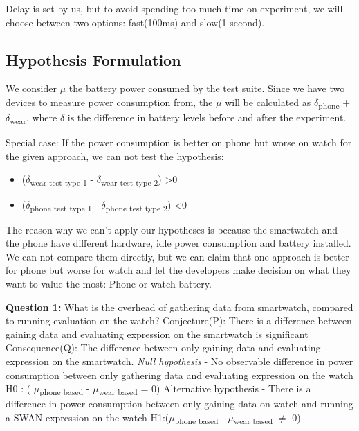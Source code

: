 Delay is set by us, but to avoid spending too much time on experiment, we will choose between two options: fast(100ms) and slow(1 second).

\subsection{ Hypothesis Formulation}

    We consider $\mu$ the battery power consumed by the test suite. Since we have two devices to measure power consumption from,
    the $\mu$ will be calculated as $\delta$\textsubscript{phone} +  $\delta$\textsubscript{wear}, where $\delta$ is the difference in battery levels 
    before and after the experiment.
    
    Special case:\label{special_case} If the power consumption is better on phone but worse on watch for the given approach, we can not test the hypothesis:
    \begin{itemize}
     \item ($\delta$\textsubscript{wear test type 1} -  $\delta$\textsubscript{wear test type 2}) \textgreater  0
     \item  ($\delta$\textsubscript{phone test type 1} -  $\delta$\textsubscript{phone test type 2}) \textless  0 
    \end{itemize}
    
    The reason why we can't apply our hypotheses is because the smartwatch and the phone have different hardware, idle power consumption and 
    battery installed. We can not compare them directly, but we can claim that one approach is better for phone but worse for watch and let the developers
    make decision on what they want to value the most: Phone or watch battery.

    \textbf{Question 1:} What is the overhead of gathering data from smartwatch, compared to running evaluation on the watch? \newline
Conjecture(P): There is a difference between gaining data and evaluating expression on the smartwatch is significant \newline
Consequence(Q): The difference between only gaining data and evaluating expression on the smartwatch. \newline
\textit{Null hypothesis} - No observable difference in power consumption between only gathering data and evaluating expression on the watch \newline
H0 : ( $\mu$\textsubscript{phone based} - $\mu$\textsubscript{wear based} = 0) \newline
  Alternative hypothesis - There is a difference in power consumption between only gaining data on watch and running a SWAN expression on the watch \newline
H1:($\mu$\textsubscript{phone based} - $\mu$\textsubscript{wear based} $\neq$ 0)  \newline

